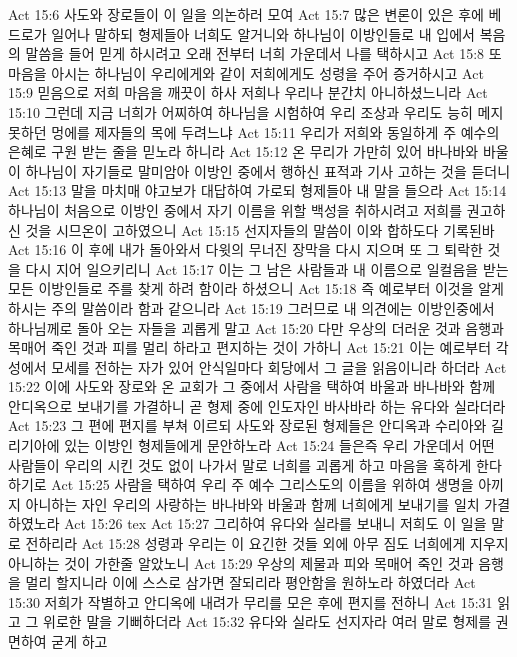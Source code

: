 Act 15:6  사도와 장로들이 이 일을 의논하러 모여
Act 15:7  많은 변론이 있은 후에 베드로가 일어나 말하되 형제들아 너희도 알거니와 하나님이 이방인들로 내 입에서 복음의 말씀을 들어 믿게 하시려고 오래 전부터 너희 가운데서 나를 택하시고
Act 15:8  또 마음을 아시는 하나님이 우리에게와 같이 저희에게도 성령을 주어 증거하시고
Act 15:9  믿음으로 저희 마음을 깨끗이 하사 저희나 우리나 분간치 아니하셨느니라
Act 15:10  그런데 지금 너희가 어찌하여 하나님을 시험하여 우리 조상과 우리도 능히 메지 못하던 멍에를 제자들의 목에 두려느냐
Act 15:11  우리가 저희와 동일하게 주 예수의 은혜로 구원 받는 줄을 믿노라 하니라
Act 15:12  온 무리가 가만히 있어 바나바와 바울이 하나님이 자기들로 말미암아 이방인 중에서 행하신 표적과 기사 고하는 것을 듣더니
Act 15:13  말을 마치매 야고보가 대답하여 가로되 형제들아 내 말을 들으라
Act 15:14  하나님이 처음으로 이방인 중에서 자기 이름을 위할 백성을 취하시려고 저희를 권고하신 것을 시므온이 고하였으니
Act 15:15  선지자들의 말씀이 이와 합하도다 기록된바
Act 15:16  이 후에 내가 돌아와서 다윗의 무너진 장막을 다시 지으며 또 그 퇴락한 것을 다시 지어 일으키리니
Act 15:17  이는 그 남은 사람들과 내 이름으로 일컬음을 받는 모든 이방인들로 주를 찾게 하려 함이라 하셨으니
Act 15:18  즉 예로부터 이것을 알게 하시는 주의 말씀이라 함과 같으니라
Act 15:19  그러므로 내 의견에는 이방인중에서 하나님께로 돌아 오는 자들을 괴롭게 말고
Act 15:20  다만 우상의 더러운 것과 음행과 목매어 죽인 것과 피를 멀리 하라고 편지하는 것이 가하니
Act 15:21  이는 예로부터 각 성에서 모세를 전하는 자가 있어 안식일마다 회당에서 그 글을 읽음이니라 하더라
Act 15:22  이에 사도와 장로와 온 교회가 그 중에서 사람을 택하여 바울과 바나바와 함께 안디옥으로 보내기를 가결하니 곧 형제 중에 인도자인 바사바라 하는 유다와 실라더라
Act 15:23  그 편에 편지를 부쳐 이르되 사도와 장로된 형제들은 안디옥과 수리아와 길리기아에 있는 이방인 형제들에게 문안하노라
Act 15:24  들은즉 우리 가운데서 어떤 사람들이 우리의 시킨 것도 없이 나가서 말로 너희를 괴롭게 하고 마음을 혹하게 한다 하기로
Act 15:25  사람을 택하여 우리 주 예수 그리스도의 이름을 위하여 생명을 아끼지 아니하는 자인 우리의 사랑하는 바나바와 바울과 함께 너희에게 보내기를 일치 가결하였노라
Act 15:26  tex
Act 15:27  그리하여 유다와 실라를 보내니 저희도 이 일을 말로 전하리라
Act 15:28  성령과 우리는 이 요긴한 것들 외에 아무 짐도 너희에게 지우지 아니하는 것이 가한줄 알았노니
Act 15:29  우상의 제물과 피와 목매어 죽인 것과 음행을 멀리 할지니라 이에 스스로 삼가면 잘되리라 평안함을 원하노라 하였더라
Act 15:30  저희가 작별하고 안디옥에 내려가 무리를 모은 후에 편지를 전하니
Act 15:31  읽고 그 위로한 말을 기뻐하더라
Act 15:32  유다와 실라도 선지자라 여러 말로 형제를 권면하여 굳게 하고
